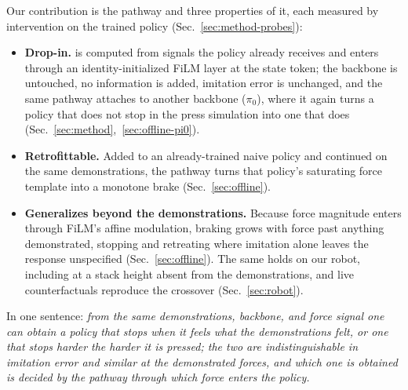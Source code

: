 Our contribution is the pathway and three properties of it, each measured by intervention on
the trained policy (Sec.~\ref{sec:method-probes}):
\begin{itemize}
\item \textbf{Drop-in.} \chat{} is computed from signals the policy already receives and
  enters through an identity-initialized FiLM layer at the state token; the backbone is
  untouched, no information is added, imitation error is unchanged, and the same pathway
  attaches to another backbone ($\pi_0$), where it again turns a policy that does not stop in
  the press simulation into one that does (Sec.~\ref{sec:method},~\ref{sec:offline-pi0}).
\item \textbf{Retrofittable.} Added to an already-trained naive policy and continued on the
  same demonstrations, the pathway turns that policy's saturating force template into a
  monotone brake (Sec.~\ref{sec:offline}).
\item \textbf{Generalizes beyond the demonstrations.} Because force magnitude enters through
  FiLM's affine modulation, braking grows with force past anything demonstrated, stopping and retreating where
  imitation alone leaves the response unspecified (Sec.~\ref{sec:offline}). The same holds on
  our robot, including at a stack height absent from the demonstrations, and live
  counterfactuals reproduce the crossover (Sec.~\ref{sec:robot}).
\end{itemize}

\noindent In one sentence: \emph{from the same demonstrations, backbone, and force signal one
can obtain a policy that stops when it feels what the demonstrations felt, or one that stops
harder the harder it is pressed; the two are indistinguishable in imitation error and similar
at the demonstrated forces, and which one is obtained is decided by the pathway through which
force enters the policy.}
